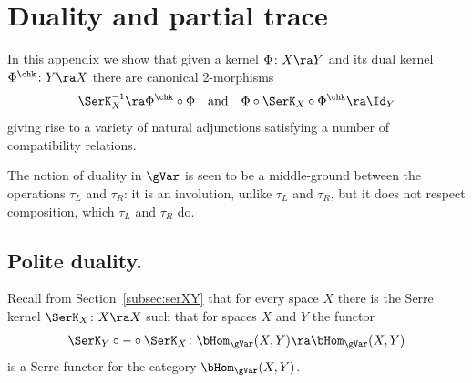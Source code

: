 \appendix

\section{Duality and partial trace}
\label{sec:duality}

In this appendix we show that given a kernel $\Phi\colon X\ra Y$ and
its dual kernel \(\Phi^\chk\colon Y \ra X\) there are canonical
2-morphisms
\[ \SerK_X^{-1} \ra \Phi^\chk \circ \Phi\quad\text{and}\quad \Phi
\circ \SerK_X \circ \Phi^\chk \ra \Id_Y \]
giving rise to a variety of natural adjunctions satisfying
a number of compatibility relations.

The notion of duality in $\gVar$ is seen to be a middle-ground between
the operations $\tau_L$ and $\tau_R$: it is an involution, unlike
$\tau_L$ and $\tau_R$, but it does not respect composition, which
$\tau_L$ and $\tau_R$ do.

 \subsection{Polite duality.}
Recall from Section~\ref{subsec:serXY} that for every space $X$ there
is the Serre kernel $\SerK_X\colon X \ra X$ such that for spaces $X$
and $Y$ the functor
\[ \SerK_Y \circ {-} \circ \SerK_X\colon \bHom_\gVar(X, Y) \ra
\bHom_\gVar(X, Y) \]
is a Serre functor for the category $\bHom_\gVar(X,Y)$.

